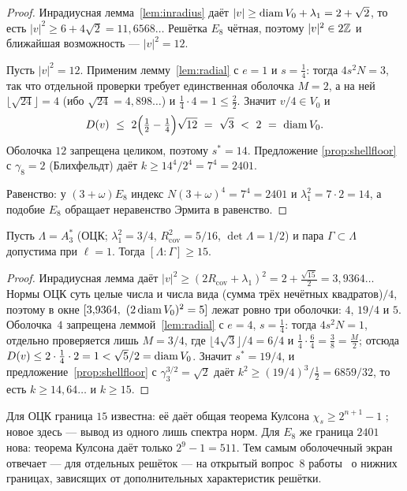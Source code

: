 \begin{proof}
Инрадиусная лемма~\ref{lem:inradius} даёт
$|v|\ge\operatorname{diam} V_0+\lambda_1=2+\sqrt2$, то есть $|v|^2\ge6+4\sqrt2=11{,}6568\ldots$
Решётка $E_8$ чётная, поэтому $|v|^2\in2\mathbb{Z}$ и ближайшая возможность ---
$|v|^2=12$.

Пусть $|v|^2=12$. Применим лемму~\ref{lem:radial} с $e=1$ и $s=\tfrac14$: тогда
$4s^2N=3$, так что отдельной проверки требует единственная оболочка $M=2$, а на
ней $\lfloor\sqrt{24}\rfloor=4$ (ибо $\sqrt{24}=4{,}898\ldots$) и
$\tfrac14\cdot4=1\le\tfrac22$. Значит $v/4\in V_0$ и
\[
D(v)\ \le\ 2\Bigl(\tfrac12-\tfrac14\Bigr)\sqrt{12}\ =\ \sqrt3\ <\ 2\ =\ \diam V_0 .
\]
Оболочка $12$ запрещена целиком, поэтому $s^{\ast}=14$. Предложение
\ref{prop:shellfloor} с $\gamma_8=2$ (Блихфельдт) даёт
$k\ge14^4/2^4=7^4=2401$.

Равенство: у $(3+\omega)E_8$ индекс $N(3+\omega)^4=7^4=2401$ и
$\lambda_1^2=7\cdot2=14$, а подобие $E_8$ обращает неравенство Эрмита в
равенство.
\end{proof}

\begin{keybox}
\begin{theorem}\label{thm:a3opt}
Пусть $\Lambda=A_3^{*}$ (ОЦК; $\lambda_1^2=3/4$,
$R_{\mathrm{cov}}^2=5/16$, $\det\Lambda=1/2$) и пара $\Gamma\subset\Lambda$
допустима при $\ell=1$. Тогда $[\Lambda:\Gamma]\ge15$.
\end{theorem}
\end{keybox}

\begin{proof}
Инрадиусная лемма даёт $|v|^2\ge(2R_{\mathrm{cov}}+\lambda_1)^2=
2+\tfrac{\sqrt{15}}2=3{,}9364\ldots$ Нормы ОЦК суть целые числа и числа вида
(сумма трёх нечётных квадратов)$/4$, поэтому в окне
$[3{,}9364,\ (2\operatorname{diam} V_0)^2=5]$ лежат ровно три оболочки: $4$, $19/4$ и $5$.
Оболочка~$4$ запрещена леммой~\ref{lem:radial} с $e=4$, $s=\tfrac14$: тогда
$4s^2N=1$, отдельно проверяется лишь $M=3/4$, где
$\lfloor4\sqrt3\rfloor/4=6/4$ и $\tfrac14\cdot\tfrac64=\tfrac38=\tfrac M2$;
отсюда $D(v)\le2\cdot\tfrac14\cdot2=1<\sqrt{5}/2=\operatorname{diam} V_0$. Значит
$s^{\ast}=19/4$, и предложение~\ref{prop:shellfloor} с
$\gamma_3^{3/2}=\sqrt2$ даёт $k^2\ge(19/4)^3/\tfrac12=6859/32$, то есть
$k\ge14{,}64\ldots$ и $k\ge15$.
\end{proof}

Для ОЦК граница $15$ известна: её даёт общая теорема Кулсона
$\chi_s\ge2^{n+1}-1$ \cite{Coulson}; новое здесь --- вывод из одного лишь
спектра норм. Для $E_8$ же граница $2401$ нова: теорема Кулсона даёт только
$2^9-1=511$. Тем самым оболочечный экран отвечает --- для отдельных решёток
--- на открытый вопрос~8 работы~\cite{ABPR} о нижних границах, зависящих
от дополнительных характеристик решётки.

